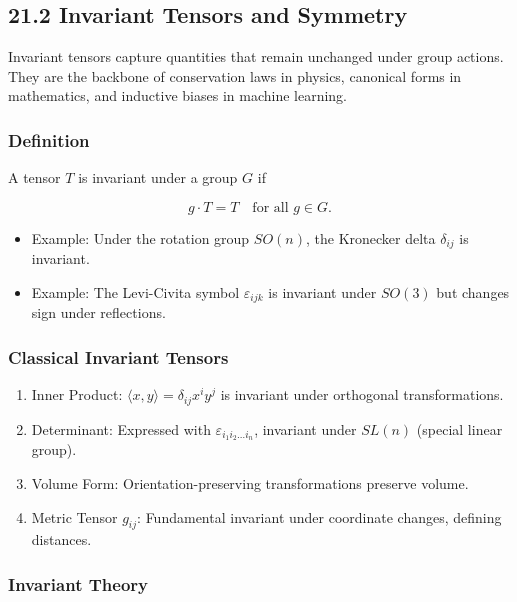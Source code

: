 \documentclass[
  letterpaper,
  DIV=11,
  numbers=noendperiod]{scrreprt}
\providecommand{\tightlist}{%
  \setlength{\itemsep}{0pt}\setlength{\parskip}{0pt}}
\begin{document}
\subsection{21.2 Invariant Tensors and
Symmetry}\label{invariant-tensors-and-symmetry}

Invariant tensors capture quantities that remain unchanged under group
actions. They are the backbone of conservation laws in physics,
canonical forms in mathematics, and inductive biases in machine
learning.

\subsubsection{Definition}\label{definition-3}

A tensor \(T\) is invariant under a group \(G\) if

\[
g \cdot T = T \quad \text{for all } g \in G.
\]

\begin{itemize}
\tightlist
\item
  Example: Under the rotation group \(SO(n)\), the Kronecker delta
  \(\delta_{ij}\) is invariant.
\item
  Example: The Levi-Civita symbol \(\varepsilon_{ijk}\) is invariant
  under \(SO(3)\) but changes sign under reflections.
\end{itemize}

\subsubsection{Classical Invariant
Tensors}\label{classical-invariant-tensors}

\begin{enumerate}
\def\labelenumi{\arabic{enumi}.}
\item
  Inner Product: \(\langle x, y \rangle = \delta_{ij} x^i y^j\) is
  invariant under orthogonal transformations.
\item
  Determinant: Expressed with \(\varepsilon_{i_1 i_2 \dots i_n}\),
  invariant under \(SL(n)\) (special linear group).
\item
  Volume Form: Orientation-preserving transformations preserve volume.
\item
  Metric Tensor \(g_{ij}\): Fundamental invariant under coordinate
  changes, defining distances.
\end{enumerate}

\subsubsection{Invariant Theory}\label{invariant-theory}
\end{document}
